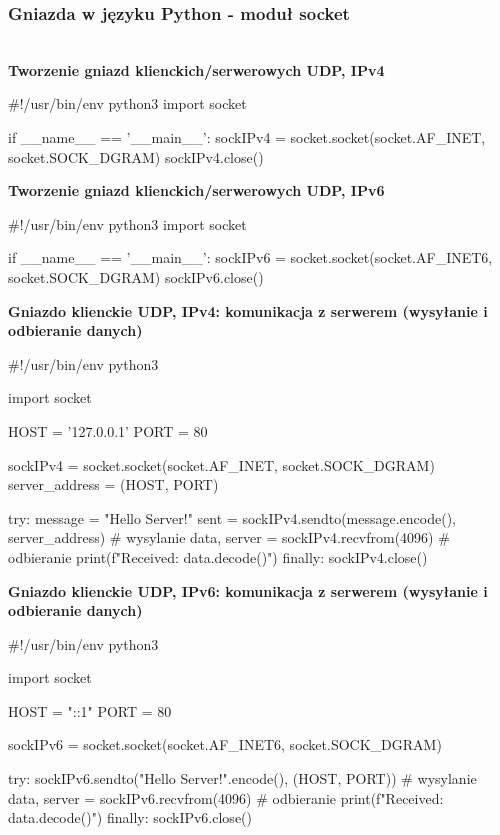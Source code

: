 \subsubsection*{Gniazda w języku Python - moduł socket} \mbox{}\\


\noindent \textbf{Tworzenie gniazd klienckich/serwerowych UDP, IPv4}

\begin{code}
#!/usr/bin/env python3
import socket 

if __name__ == '__main__':
	sockIPv4 = socket.socket(socket.AF_INET,  socket.SOCK_DGRAM)
	sockIPv4.close()
\end{code} 

\noindent \textbf{Tworzenie gniazd klienckich/serwerowych UDP, IPv6}

\begin{code}
#!/usr/bin/env python3
import socket 

if __name__ == '__main__':
	sockIPv6 = socket.socket(socket.AF_INET6,  socket.SOCK_DGRAM)
	sockIPv6.close()
\end{code} 


\noindent \textbf{Gniazdo klienckie UDP, IPv4: komunikacja z serwerem (wysyłanie i odbieranie danych)}

\begin{code}
#!/usr/bin/env python3

import socket

HOST = '127.0.0.1'
PORT = 80

sockIPv4 = socket.socket(socket.AF_INET, socket.SOCK_DGRAM)
server_address = (HOST, PORT)

try:
    message = "Hello Server!"
    sent = sockIPv4.sendto(message.encode(), server_address)		# wysylanie
    data, server = sockIPv4.recvfrom(4096)																				# odbieranie
    print(f"Received: {data.decode()}")
finally:
    sockIPv4.close()
\end{code} 
 
\noindent \textbf{Gniazdo klienckie UDP, IPv6: komunikacja z serwerem (wysyłanie i odbieranie danych)}

\begin{code}
#!/usr/bin/env python3

import socket

HOST = "::1"
PORT = 80

sockIPv6 = socket.socket(socket.AF_INET6, socket.SOCK_DGRAM)

try:
    sockIPv6.sendto("Hello Server!".encode(), (HOST, PORT))			# wysylanie
    data, server = sockIPv6.recvfrom(4096)																				# odbieranie
    print(f"Received: {data.decode()}")
finally:
    sockIPv6.close()
\end{code}

